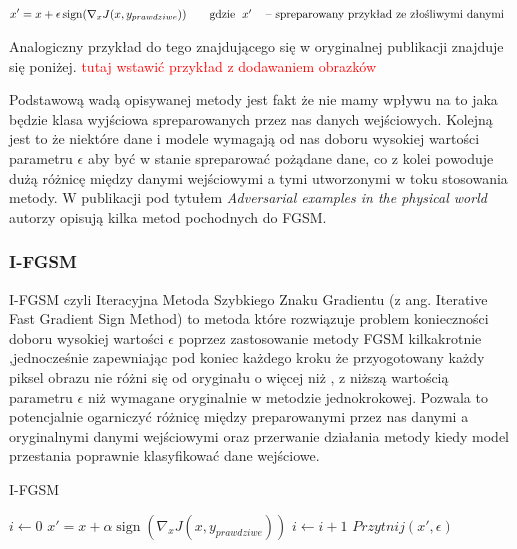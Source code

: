 \documentclass{article}
\newcommand\todo[1]{\textcolor{red}{#1}}
\begin{document}
    \begin{equation}
    x' = x + \epsilon\operatorname{sign}(\nabla_{x} J(x, y_{prawdziwe}))
    \qquad\text{gdzie}
    \begin{tabular}[t]{ll}
    $x'$  & -- spreparowany przykład ze złośliwymi danymi \\
    \end{tabular}
    \end{equation}

    Analogiczny przykład do tego znajdującego się w oryginalnej publikacji\cite{harnessing} znajduje się poniżej.
    \todo{tutaj wstawić przykład z dodawaniem obrazków}

    Podstawową wadą opisywanej metody jest fakt że nie mamy wpływu na to jaka będzie klasa wyjściowa
    spreparowanych przez nas danych wejściowych. Kolejną jest to że niektóre dane i modele wymagają od nas
    doboru wysokiej wartości parametru $\epsilon$ aby być w stanie spreparować pożądane dane, co z kolei powoduje dużą
    różnicę między danymi wejściowymi a tymi utworzonymi w toku stosowania metody.
    W publikacji pod tytułem \textit{Adversarial examples in the physical world}\cite{DBLP:journals/corr/KurakinGB16}
    autorzy opisują kilka metod pochodnych do FGSM.

    \subsubsection{I-FGSM}
    I-FGSM czyli Iteracyjna Metoda Szybkiego Znaku Gradientu (z ang. Iterative Fast Gradient Sign Method) to metoda
    które rozwiązuje problem konieczności doboru wysokiej wartości $\epsilon$ poprzez zastosowanie metody FGSM kilkakrotnie
    ,jednocześnie zapewniając pod koniec każdego kroku że przyogotowany każdy piksel obrazu nie różni się od oryginału o więcej
    niż \epsilon, z niższą wartością parametru $\epsilon$ niż wymagane oryginalnie w metodzie jednokrokowej.
    Pozwala to  potencjalnie ogarniczyć różnicę między preparowanymi przez nas danymi a oryginalnymi danymi wejściowymi
    oraz przerwanie działania metody kiedy model przestania poprawnie klasyfikować dane wejściowe.

    \begin{algorithm}
    \caption{I-FGSM}\label{IFGSM}
    \begin{algorithmic}[1]
    \State $i \gets 0$
        \State $x' = x + \alpha\operatorname{sign}(\nabla_{x} J(x, y_{prawdziwe}))$
        \State $i \gets i+1$
        \State $Przytnij(x', \epsilon)$
    \EndWhile
    \end{algorithmic}
    \end{algorithm}
\end{document}

